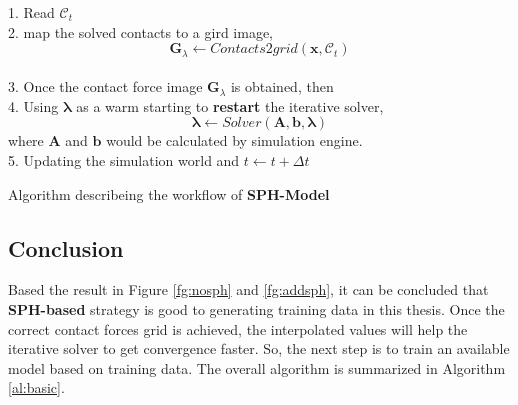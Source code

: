     \begin{algorithm}[!h]
        {
            1. Read $\mathcal{C}_t$ \\
            2. map the solved contacts to a gird image, 
                $$\pmb{G}_{\lambda} \gets Contacts2grid(\mathbf{x}, \mathcal{C}_t)$$ \\
            3. Once the contact force image $\pmb{G}_{\lambda}$ is obtained,  then \\
            4. Using $\pmb{\lambda}$ as a warm starting to \textbf{restart} the iterative solver,
            $$\pmb{\lambda} \gets Solver(\pmb{A}, \pmb{b}, \pmb{\lambda})$$ 
            where $\pmb{A}$ and $\pmb{b}$ would be calculated by simulation engine.\\ 
            5. Updating the simulation world and $t \gets t+\Delta t$
        }
        \caption{Algorithm describeing the workflow of \textbf{SPH-Model}}
        \label{testsph}
    \end{algorithm}

\subsection{Conclusion}
    Based the result in Figure \ref{fg:nosph} and \ref{fg:addsph}, it can be concluded that \textbf{SPH-based} strategy is good to generating training data in this thesis. Once the correct contact forces grid is achieved, the interpolated values will help the iterative solver to get convergence faster. So, the next step is to train an available model based on training data. The overall algorithm is summarized in Algorithm \ref{al:basic}.